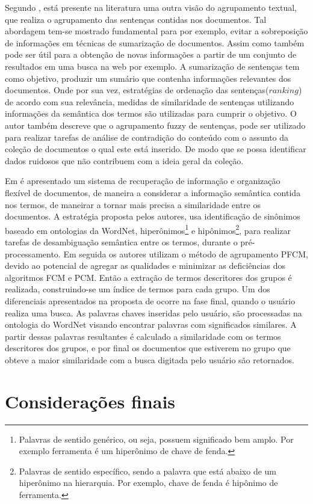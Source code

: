 Segundo \cite{Saranya2014}, está presente na literatura uma outra visão do agrupamento textual, que
realiza o agrupamento das sentenças contidas nos documentos. Tal abordagem tem-se mostrado 
fundamental para por exemplo, evitar a sobreposição de informações em técnicas de sumarização de 
documentos. Assim como também
pode ser útil para a obtenção de novas informações a partir de um conjunto de resultados em uma
busca na web por exemplo. A sumarização de sentenças tem como objetivo, produzir um sumário que
contenha informações relevantes dos documentos. Onde por sua vez, estratégias de ordenação das
sentenças($ranking$) de acordo com sua relevância, medidas de similaridade de sentenças utilizando
informações da semântica dos termos são utilizadas para cumprir o objetivo. O autor também 
descreve que o agrupamento fuzzy de sentenças, pode ser utilizado para realizar
tarefas de análise de contradição do conteúdo com o assunto da coleção de documentos o qual este
está inserido. De modo que se possa identificar dados ruidosos que não contribuem com a ideia geral
da coleção.

Em \cite{Murali2015} é apresentado um sistema de recuperação de informação e organização flexível de
documentos, de maneira a considerar a informação semântica contida nos termos, de maneirar a tornar
mais precisa a similaridade entre os documentos. A estratégia proposta pelos autores, usa
identificação de sinônimos baseado em ontologias da WordNet, 
hiperônimos\footnote{Palavras de sentido genérico, ou seja, 
  possuem significado bem amplo. Por exemplo
ferramenta é um hiperônimo de chave de fenda.} 
e hipônimos\footnote{Palavras de sentido específico, sendo a palavra que está abaixo de um 
  hiperônimo na
hierarquia. Por exemplo, chave de fenda é hipônimo de ferramenta.}, para realizar tarefas de
desambiguação semântica entre os termos, durante o pré-processamento. Em seguida os autores utilizam
o método de agrupamento PFCM, devido ao potencial de agregar as qualidades e minimizar as
deficiências dos algoritmos FCM e PCM. Então a extração de termos descritores dos grupos é
realizada, construindo-se um índice de termos para cada grupo. Um dos diferenciais apresentados na
proposta de \cite{Murali2015} ocorre na fase final, quando o usuário realiza uma busca. As palavras
chaves inseridas pelo usuário, são processadas na ontologia do WordNet visando encontrar palavras
com significados similares. A partir dessas palavras resultantes é calculado a similaridade com os
termos descritores dos grupos, e por final os documentos que estiverem no grupo que obteve a maior
similaridade com a busca digitada pelo usuário são retornados.

 
\section{Considerações finais}
